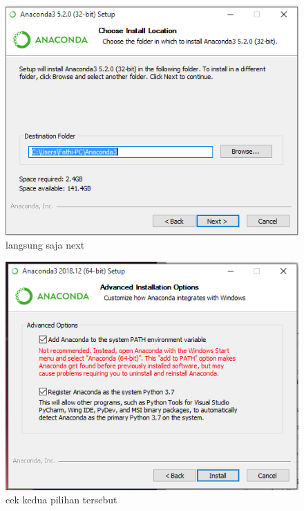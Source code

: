 \begin{enumerate}
\begin{figure}
\centerline{\includegraphics[width=1\textwidth]{figures/fathi/5.PNG}}
\caption{langsung saja next}
\label{proses5}
\end{figure}
\begin{figure}
\centerline{\includegraphics[width=1\textwidth]{figures/fathi/6.PNG}}
\caption{cek kedua pilihan tersebut}
\label{proses6}


\end{figure}
\end{enumerate}
